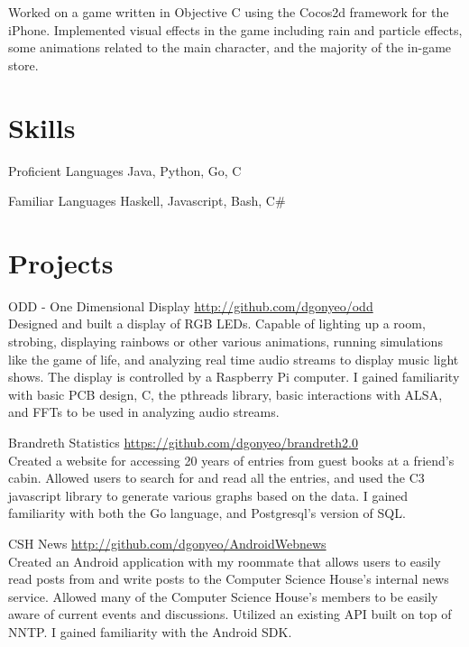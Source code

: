 \documentclass[letterpaper,margin,line,11pt]{resume}
\newcommand{\rurl}[1]{\hfill {\footnotesize \url{#1}}}
\begin{document}
\begin{resume}
\begin{asparadesc}
        \small
        Worked on a game written in Objective C using the Cocos2d framework for the iPhone. Implemented visual effects in the game including rain and particle effects, some animations related to the main character, and the majority of the in-game store.
        \normalsize
        \\
    \end{asparadesc}

\section{\mysidestyle Skills}
    \begin{compactdesc}
        \item[Proficient Languages] Java, Python, Go, C
        \item[Familiar Languages] Haskell, Javascript, Bash, C\#
    \end{compactdesc}

\section{\mysidestyle Projects}
    \begin{compactdesc}
        \item[ODD - One Dimensional Display] \rurl{http://github.com/dgonyeo/odd} \\
        Designed and built a display of RGB LEDs. Capable of lighting up a room, strobing, displaying rainbows or other various animations, running simulations like the game of life, and analyzing real time audio streams to display music light shows. The display is controlled by a Raspberry Pi computer. I gained familiarity with basic PCB design, C, the pthreads library, basic interactions with ALSA, and FFTs to be used in analyzing audio streams.
    \item[Brandreth Statistics] \rurl{https://github.com/dgonyeo/brandreth2.0} \\
            Created a website for accessing 20 years of entries from guest books at a friend's cabin. Allowed users to search for and read all the entries, and used the C3 javascript library to generate various graphs based on the data. I gained familiarity with both the Go language, and Postgresql's version of SQL.
        \item[CSH News] \rurl{http://github.com/dgonyeo/AndroidWebnews} \\
            Created an Android application with my roommate that allows users to easily read posts from and write posts to the Computer Science House's internal news service. Allowed many of the Computer Science House's members to be easily aware of current events and discussions. Utilized an existing API built on top of NNTP. I gained familiarity with the Android SDK.
    \end{compactdesc}


\end{resume}
\end{document}
